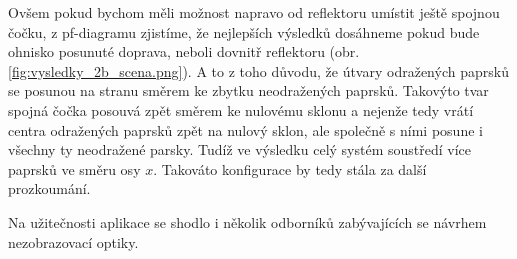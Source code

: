 Ovšem pokud bychom měli možnost napravo od reflektoru umístit ještě spojnou čočku, z pf-diagramu zjistíme, že nejlepších výsledků dosáhneme pokud bude ohnisko posunuté doprava, neboli dovnitř reflektoru (obr. \ref{fig:vysledky_2b_scena.png}). A to z toho důvodu, že útvary odražených paprsků se posunou na stranu směrem ke zbytku neodražených paprsků. Takovýto tvar spojná čočka posouvá zpět směrem ke nulovému sklonu a nejenže tedy vrátí centra odražených paprsků zpět na nulový sklon, ale společně s ními posune i všechny ty neodražené parsky. Tudíž ve výsledku celý systém soustředí více paprsků ve směru osy $x$. Takováto konfigurace by tedy stála za další prozkoumání.

Na užitečnosti aplikace se shodlo i několik odborníků zabývajících se návrhem nezobrazovací optiky.\src {}
